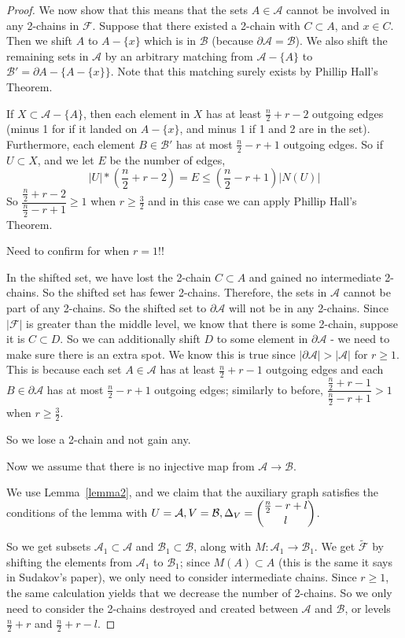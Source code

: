 \documentclass[12pt]{article}
\theoremstyle{plain}
\theoremstyle{definition}
\theoremstyle{remark}
\newcommand{\F}{\mathcal{F}}
\newcommand{\A}{\mathcal{A}}
\newcommand{\B}{\mathcal{B}}
\begin{document}
\begin{proof}
We now show that this means that the sets $A \in \A$ cannot be involved in any 2-chains in $\F$. Suppose that there existed a 2-chain with $C \subset A$, and $x \in C$. Then we shift $A$ to $A - \{ x \}$ which is in $\B$ (because $\partial \A = \B$). We also shift the remaining sets in $\A$ by an arbitrary matching from $\A - \{ A \}$ to $\B' = \partial A - \{ A - \{x\} \}$. Note that this matching surely exists by Phillip Hall's Theorem. 

If $X \subset \A - \{ A \}$, then each element in $X$ has at least $\frac{n}{2} + r - 2$ outgoing edges (minus 1 for if it landed on $A - \{x\}$, and minus 1 if 1 and 2 are in the set). Furthermore, each element $B \in \B'$ has at most $\frac{n}{2} - r + 1$ outgoing edges. So if $U \subset X$, and we let $E$ be the number of edges,
\[ |U|*(\frac{n}{2}+r-2) = E \leq (\frac{n}{2}-r+1)|N(U)| \]
So $\dfrac{\frac{n}{2}+r-2}{\frac{n}{2}-r+1} \geq 1$ when $r \geq \frac{3}{2}$ and in this case we can apply Phillip Hall's Theorem. 

Need to confirm for when $r = 1$!!

In the shifted set, we have lost the 2-chain $C \subset A$ and gained no intermediate 2-chains. So the shifted set has fewer 2-chains. Therefore, the sets in $\A$ cannot be part of any 2-chains. So the shifted set to $\partial \A$ will not be in any 2-chains. Since $|\F|$ is greater than the middle level, we know that there is some 2-chain, suppose it is $C \subset D$. So we can additionally shift $D$ to some element in $\partial \A$ - we need to make sure there is an extra spot. We know this is true since $|\partial \A| > |\A|$ for $r \geq 1$. This is because each set $A \in \A$ has at least $\frac{n}{2}+r-1$ outgoing edges and each $B \in \partial \A$ has at most $\frac{n}{2}-r+1$ outgoing edges; similarly to before, $\dfrac{\frac{n}{2}+r-1}{\frac{n}{2}-r+1} > 1$ when $r \geq \frac{3}{2}$. 

So we lose a 2-chain and not gain any. 

Now we assume that there is no injective map from $\A \rightarrow \B$.

We use Lemma~\ref{lemma2}, and we claim that the auxiliary graph satisfies the conditions of the lemma with $U = \A, V = \B, \Delta_V = \dbinom{\frac{n}{2} - r + l}{l}$.

So we get subsets $\A_1 \subset \A$ and $\B_1 \subset \B$, along with $M:\A_1 \rightarrow \B_1$. We get $\tilde{\F}$ by shifting the elements from $\A_1$ to $\B_1$; since $M(A) \subset A$ (this is the same it says in Sudakov's paper), we only need to consider intermediate chains. Since $r \geq 1$, the same calculation yields that we decrease the number of 2-chains. So we only need to consider the 2-chains destroyed and created between $\A$ and $\B$, or levels $\frac{n}{2} + r$ and $\frac{n}{2} + r - l$.


\end{proof}
\end{document}
